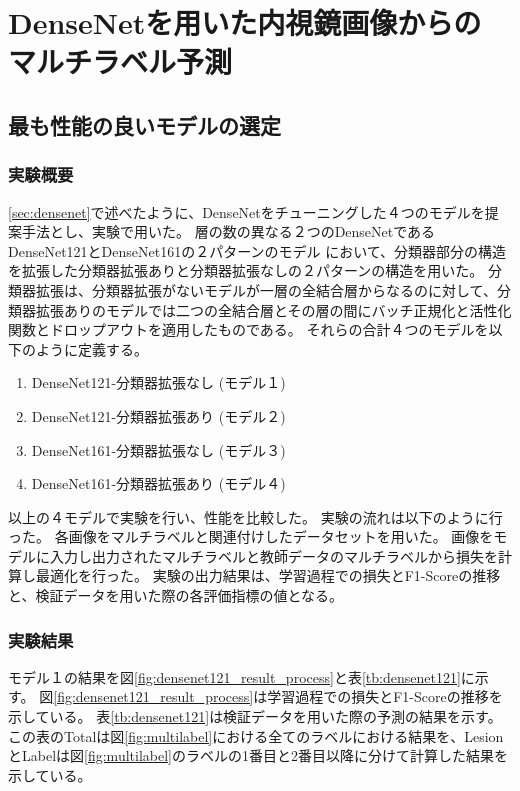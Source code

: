 \section{DenseNetを用いた内視鏡画像からの\\マルチラベル予測}
\subsection{最も性能の良いモデルの選定}
\label{sec:ex1}
\subsubsection{実験概要}
\ref{sec:densenet}で述べたように、DenseNetをチューニングした４つのモデルを提案手法とし、実験で用いた。
層の数の異なる２つのDenseNetであるDenseNet121とDenseNet161の２パターンのモデル
において、分類器部分の構造を拡張した分類器拡張ありと分類器拡張なしの２パターンの構造を用いた。
分類器拡張は、分類器拡張がないモデルが一層の全結合層からなるのに対して、分類器拡張ありのモデルでは二つの全結合層とその層の間にバッチ正規化と活性化関数とドロップアウトを適用したものである。
それらの合計４つのモデルを以下のように定義する。

\begin{enumerate}
    \item DenseNet121-分類器拡張なし (モデル１)
    \item DenseNet121-分類器拡張あり (モデル２)
    \item DenseNet161-分類器拡張なし (モデル３)
    \item DenseNet161-分類器拡張あり (モデル４)
\end{enumerate}
以上の４モデルで実験を行い、性能を比較した。
実験の流れは以下のように行った。
各画像をマルチラベルと関連付けしたデータセットを用いた。
画像をモデルに入力し出力されたマルチラベルと教師データのマルチラベルから損失を計算し最適化を行った。
実験の出力結果は、学習過程での損失とF1-Scoreの推移と、検証データを用いた際の各評価指標の値となる。

\subsubsection{実験結果}
モデル１の結果を図\ref{fig:densenet121_result_process}と表\ref{tb:densenet121}に示す。
図\ref{fig:densenet121_result_process}は学習過程での損失とF1-Scoreの推移を示している。
表\ref{tb:densenet121}は検証データを用いた際の予測の結果を示す。
この表のTotalは図\ref{fig:multilabel}における全てのラベルにおける結果を、LesionとLabelは図\ref{fig:multilabel}のラベルの1番目と2番目以降に分けて計算した結果を示している。


